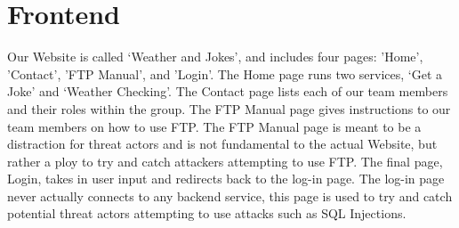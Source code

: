 \section{Frontend}
Our Website is called ‘Weather and Jokes’, and includes four pages: 'Home', 'Contact', 'FTP Manual', and 'Login'. The Home page runs two services, ‘Get a Joke’ and ‘Weather Checking’. The Contact page lists each of our team members and their roles within the group. The FTP Manual page gives instructions to our team members on how to use FTP. The FTP Manual page is meant to be a distraction for threat actors and is not fundamental to the actual Website, but rather a ploy to try and catch attackers attempting to use FTP. The final page, Login, takes in user input and redirects back to the log-in page. The log-in page never actually connects to any backend service, this page is used to try and catch potential threat actors attempting to use attacks such as SQL Injections.
